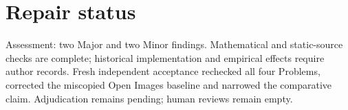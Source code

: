 \documentclass[10pt]{article}
\begin{document}
\section*{Repair status}
Assessment: two Major and two Minor findings. Mathematical and static-source checks are complete; historical implementation and empirical effects require author records. Fresh independent acceptance rechecked all four Problems, corrected the miscopied Open Images baseline and narrowed the comparative claim. Adjudication remains pending; human reviews remain empty.\par
\end{document}
